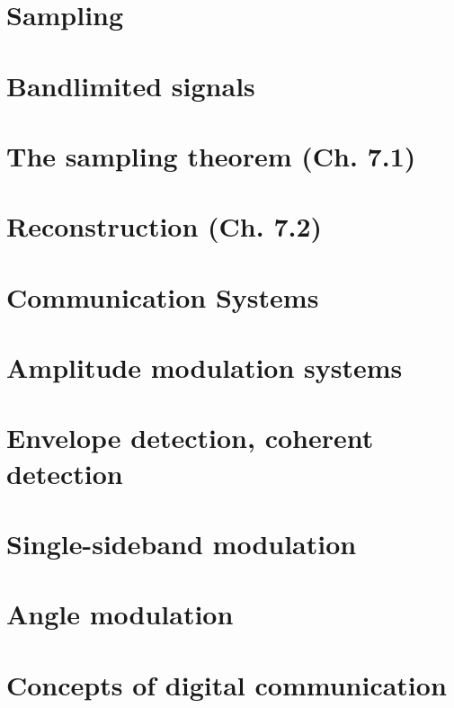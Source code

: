 \documentclass{article}
\begin{document}
\section*{Sampling}
\section{Bandlimited signals}
\newpage

\section{The sampling theorem (Ch. 7.1)}
\newpage

\section{Reconstruction (Ch. 7.2)}
\newpage

\section*{Communication Systems}
\section{Amplitude modulation systems}
\newpage

\section{Envelope detection, coherent detection}
\newpage

\section{Single-sideband modulation}
\newpage

\section{Angle modulation}
\newpage

\section{Concepts of digital communication}
\end{document}
